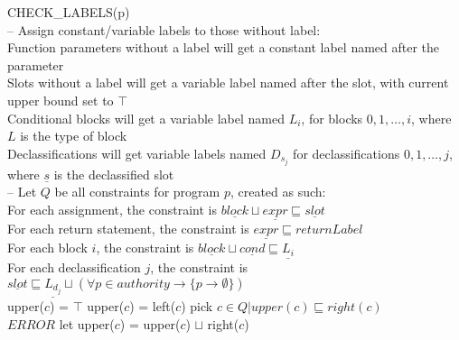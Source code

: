 \begin{algorithm}[h]
\SetAlgoNoEnd
CHECK\_LABELS(p)\\
-- Assign constant/variable labels to those without label:\\
Function parameters without a label will get a constant label named after the parameter\\
Slots without a label will get a variable label named after the slot, with current upper bound set to $\top$\\
Conditional blocks will get a variable label named $L_i$, for blocks $0, 1, \dots, i$, where $L$ is the type of block\\
Declassifications will get variable labels named $D_{s_j}$ for declassifications $0, 1, \dots, j$, where $\underline{s}$ is the declassified slot\\
-- Let $Q$ be all constraints for program $p$, created as such:\\
For each assignment, the constraint is $\underline{block} \sqcup \underline{expr} \sqsubseteq \underline{slot}$\\
For each return statement, the constraint is $\underline{expr} \sqsubseteq returnLabel$\\
For each block $i$, the constraint is $\underline{block} \sqcup \underline{cond} \sqsubseteq \underline{L_i}$\\
For each declassification $j$, the constraint is $\underline{slot} \sqsubseteq \underline{L_{d_j}} \sqcup (\forall p \in authority \longrightarrow \{ p \rightarrow \emptyset\})$\\
{
  {
    upper($c$) = $\top$
  }
  \Else
  {
    upper($c$) = left($c$)
  }
}
{
  pick $c \in Q | upper(c) \sqsubseteq right(c)$\\
  {
    $ERROR$
  }
  let upper($c$) = upper($c$) $\sqcup$ right($c$)
}
\end{algorithm}
